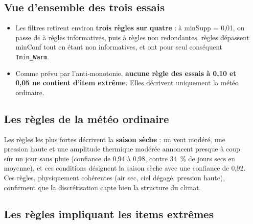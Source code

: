 \documentclass[12pt, a4paper]{article}
\newcommand{\itm}[1]{\texttt{#1}}
\newcommand{\tabin}[1]{\rowcolors{2}{GrisL}{white}}
\begin{document}
\subsection{Vue d'ensemble des trois essais}

\begin{table}[H]
\centering
\caption{Nombre de règles par essai (minConf = 0,7).}
\label{tab:essais}
\tabin{tab_essais}
\end{table}

\begin{itemize}
  \item Les filtres retirent environ \textbf{trois règles sur quatre} : à minSupp = 0,01, on
        passe de \NreglesBrutes{} à \NreglesInf{} règles informatives, puis à
        \NreglesClean{} règles non redondantes. \NreglesNonInf{} règles dépassent minConf tout
        en étant non informatives, et \NreglesTminWarm{} ont pour seul conséquent
        \itm{Tmin\_Warm}.
  \item Comme prévu par l'anti-monotonie, \textbf{aucune règle des essais à 0,10 et 0,05 ne
        contient d'item extrême}. Elles décrivent uniquement la météo ordinaire.
\end{itemize}

\subsection{Les règles de la météo ordinaire}

\begin{table}[H]
\centering
\caption{Règles les plus marquées sans item extrême (essai à 0,01, règles filtrées).}
\label{tab:ordinaires}
\tabin{tab_regles_ordinaires}
\end{table}

Les règles les plus fortes décrivent la \textbf{saison sèche} : un vent modéré, une pression
haute et une amplitude thermique modérée annoncent presque à coup sûr un jour sans pluie
(confiance de 0,94 à 0,98, contre 34~\% de jours secs en moyenne), et ces conditions
désignent la saison sèche avec une confiance de 0,92. Ces règles, physiquement cohérentes
(air sec, ciel dégagé, pression haute), confirment que la discrétisation capte bien la
structure du climat.

\subsection{Les règles impliquant les items extrêmes}
\label{sec:res_extremes}
\end{document}
